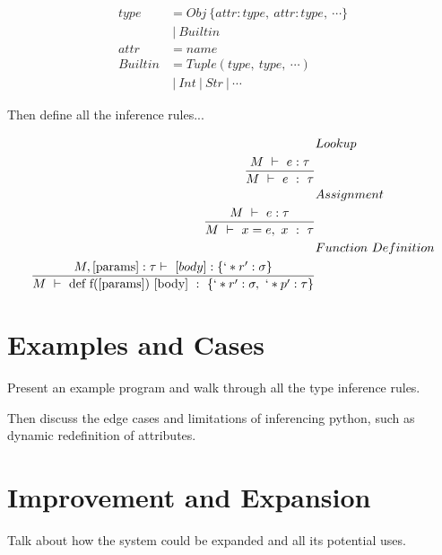 \documentclass{article}
\begin{document}
\begin{align*}
type &= Obj\ \{ attr : type,\ attr:type,\ \cdots \} \\
     &\ |\ Builtin \\
attr &= name \\
Builtin &= Tuple (type,\ type,\ \cdots) \\
        &\ |\ Int\ |\ Str\ |\ \cdots
\end{align*}

Then define all the inference rules...

\begin{align*}
&Lookup\\
\frac{M\ \vdash\ e:\tau} {M\ \vdash\ e\ :\ \tau} \\
&Assignment\\
\frac{M\ \vdash\ e:\tau} {M\ \vdash\ x = e,\ x\ :\ \tau} \\
&Function\ Definition\\
\frac{M,\text{[params]}:\tau\vdash\ [body]:\{`*r':\sigma\}} {M\ \vdash\ \text{def f([params]) [body]}\ :\ \{`*r':\sigma,\ `*p': \tau\}}
\end{align*}

\section*{Examples and Cases}

Present an example program and walk through all the type inference rules. 

Then discuss the edge cases and limitations of inferencing python, such as dynamic redefinition of attributes.

\section*{Improvement and Expansion}

Talk about how the system could be expanded and all its potential uses.
\end{document}
